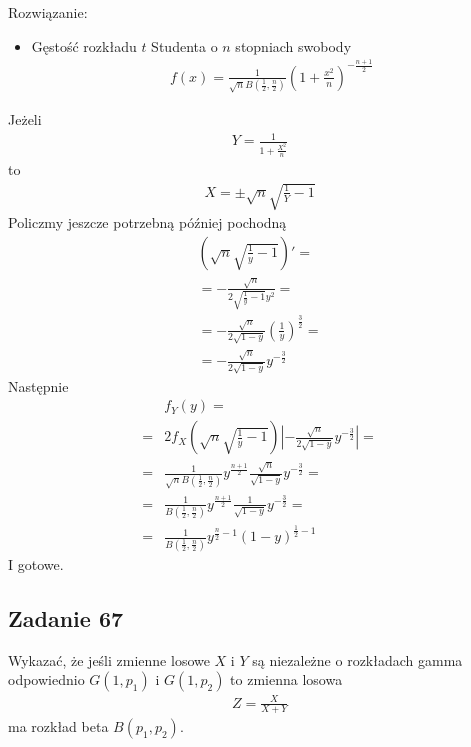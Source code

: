 Rozwiązanie:
\begin{itemize}
\item Gęstość rozkładu $ t $ Studenta o $ n $ stopniach swobody
\begin{gather*}
f(x)=\frac{1}{\sqrt nB \left(\frac{1}{2},\frac{n}{2}\right)}\left(1+\frac{x^2}{n}\right)^{-\frac{n+1}{2}}
\end{gather*}
\end{itemize}
Jeżeli
\begin{gather*}
Y=\frac{1}{1+\frac{X^2}{n}}
\end{gather*}
to
\begin{gather*}
X=\pm\sqrt n\sqrt{\frac{1}{Y}-1}
\end{gather*}
Policzmy jeszcze potrzebną później pochodną
\begin{gather*}
\left(\sqrt n\sqrt{\frac{1}{y}-1}\right)'
=\\=
-\frac{\sqrt{n}}{2 \sqrt{\frac{1}{y}-1} y^2}
=\\=
-\frac{\sqrt{n}}{2\sqrt{1-y}} \left(\frac{1}{y}\right)^{\frac{3}{2}}
=\\=
-\frac{\sqrt{n}}{2\sqrt{1-y}} y^{-\frac{3}{2}}
\end{gather*}
Następnie
\begin{align*}
&f_Y(y)
=\\=&
2f_X\left(\sqrt n\sqrt{\frac{1}{y}-1}\right)\left|-\frac{\sqrt{n}}{2\sqrt{1-y}} y^{-\frac{3}{2}}\right|
=\\=&
\frac{1}{\sqrt nB \left(\frac{1}{2},\frac{n}{2}\right)}y^{\frac{n+1}{2}}\frac{\sqrt{n}}{\sqrt{1-y}} y^{-\frac{3}{2}}
=\\=&
\frac{1}{B \left(\frac{1}{2},\frac{n}{2}\right)}y^{\frac{n+1}{2}}\frac{1}{\sqrt{1-y}} y^{-\frac{3}{2}}
=\\=&
\frac{1}{B \left(\frac{1}{2},\frac{n}{2}\right)}y^{\frac{n}{2}-1}\left(1-y\right)^{\frac{1}{2}-1}
\end{align*}
I gotowe.


\subsection*{Zadanie 67}
Wykazać, że jeśli zmienne losowe $ X $ i $ Y $ są niezależne o rozkładach gamma odpowiednio $ G(1,p_1) $ i $ G(1,p_2) $ to zmienna losowa
\begin{gather*}
Z=\frac{X}{X+Y}
\end{gather*}
ma rozkład beta $ B (p_1,p_2) $.

